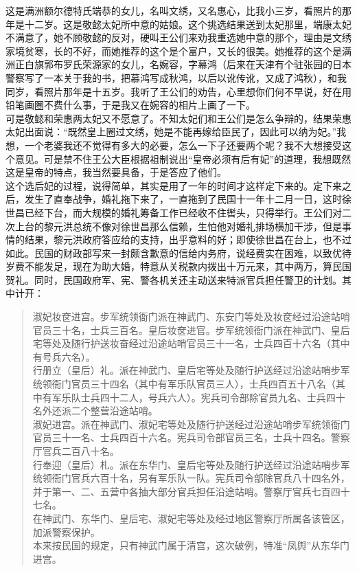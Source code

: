 这是满洲额尔德特氏端恭的女儿，名叫文绣，又名惠心，比我小三岁，看照片的那年是十二岁。这是敬懿太妃所中意的姑娘。这个挑选结果送到太妃那里，端康太妃不满意了，她不顾敬懿的反对，硬叫王公们来劝我重选她中意的那个，理由是文绣家境贫寒，长的不好，而她推荐的这个是个富户，又长的很美。她推荐的这个是满洲正白旗郭布罗氏荣源家的女儿，名婉容，字幕鸿（后来在天津有个驻张园的日本警察写了一本关于我的书，把慕鸿写成秋鸿，以后以讹传讹，又成了鸿秋），和我同岁，看照片那年是十五岁。我听了王公们的劝告，心里想你们何不早说，好在用铅笔画圈不费什么事，于是我又在婉容的相片上画了一下。\\

可是敬懿和荣惠两太妃又不愿意了。不知太妃们和王公们是怎么争辩的，结果荣惠太妃出面说：“既然皇上圈过文绣，她是不能再嫁给臣民了，因此可以纳为妃。”我想，一个老婆我还不觉得有多大的必要，怎么一下子还要两个呢？我不大想接受这个意见。可是禁不住王公大臣根据祖制说出“皇帝必须有后有妃”的道理，我想既然这是皇帝的特点，我当然要具备，于是答应了他们。\\

这个选后妃的过程，说得简单，其实是用了一年的时间才这样定下来的。定下来之后，发生了直奉战争，婚礼拖下来了，一直拖到了民国十一年十二月一日，这时徐世昌已经下台，而大规模的婚礼筹备工作已经收不住辔头，只得举行。王公们对二次上台的黎元洪总统不像对徐世昌那么信赖，生怕他对婚礼排场横加干涉，但是事情的结果，黎元洪政府答应给的支持，出乎意料的好；即使徐世昌在台上，也不过如此。民国的财政部写来一封颇含歉意的信给内务府，说经费实在困难，以致优待岁费不能发足，现在为助大婚，特意从关税款内拨出十万元来，其中两万，算民国贺礼。同时，民国政府军、宪、警各机关还主动送来特派官兵担任警卫的计划。其中计开：\\

\begin{quote}
	淑妃妆奁进宫。步军统领衙门派在神武门、东安门等处及妆奁经过沿途站哨官员三十名，士兵三百名。皇后妆奁进官。步军统领衙门派在神武门、皇后宅等处及随行护送妆奋经过沿途站哨官员三十一名，士兵四百十六名（其中有号兵六名）。\\

行册立（皇后）礼。派在神武门、皇后宅等处及随行护送经过沿途站哨步军统领衙门官员三十四名（其中有军乐队官员三人），士兵四百五十八名（其中有军乐队士兵四十二人，号兵六人）。宪兵司令部除官员九名、士兵四十名外还派二个整营沿途站哨。\\

淑妃进宫。派在神武门、淑妃宅等处及随行护送经过沿途站哨步军统领衙门官员三十一名、士兵四百十六名。宪兵司令部官员三名，士兵十四名。警察厅官兵二百八十名。\\

行奉迎（皇后）札。派在东华门、皇后宅等处及随行护送经过沿途站哨步军统领衙门官兵六百十名，另有军乐队一队。宪兵司令部除官兵八十四名外，并于第一、二、五营中各抽大部分官兵担任沿途站哨。警察厅官兵七百四十七名。\\

在神武门、东华门、皇后宅、淑妃宅等处及经过地区警察厅所属各该管区，加派警察保护。\\

本来按民国的规定，只有神武门属于清宫，这次破例，特准“凤舆”从东华门进宫。\\
\end{quote}

